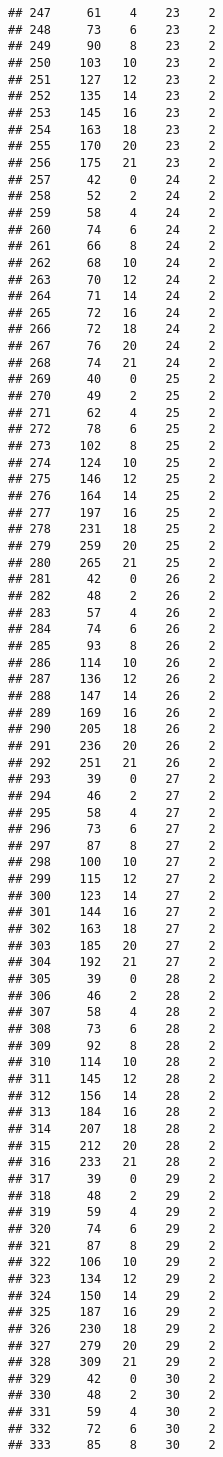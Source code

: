 \documentclass[
]{article}
\begin{document}
\begin{verbatim}
## 247     61    4    23    2
## 248     73    6    23    2
## 249     90    8    23    2
## 250    103   10    23    2
## 251    127   12    23    2
## 252    135   14    23    2
## 253    145   16    23    2
## 254    163   18    23    2
## 255    170   20    23    2
## 256    175   21    23    2
## 257     42    0    24    2
## 258     52    2    24    2
## 259     58    4    24    2
## 260     74    6    24    2
## 261     66    8    24    2
## 262     68   10    24    2
## 263     70   12    24    2
## 264     71   14    24    2
## 265     72   16    24    2
## 266     72   18    24    2
## 267     76   20    24    2
## 268     74   21    24    2
## 269     40    0    25    2
## 270     49    2    25    2
## 271     62    4    25    2
## 272     78    6    25    2
## 273    102    8    25    2
## 274    124   10    25    2
## 275    146   12    25    2
## 276    164   14    25    2
## 277    197   16    25    2
## 278    231   18    25    2
## 279    259   20    25    2
## 280    265   21    25    2
## 281     42    0    26    2
## 282     48    2    26    2
## 283     57    4    26    2
## 284     74    6    26    2
## 285     93    8    26    2
## 286    114   10    26    2
## 287    136   12    26    2
## 288    147   14    26    2
## 289    169   16    26    2
## 290    205   18    26    2
## 291    236   20    26    2
## 292    251   21    26    2
## 293     39    0    27    2
## 294     46    2    27    2
## 295     58    4    27    2
## 296     73    6    27    2
## 297     87    8    27    2
## 298    100   10    27    2
## 299    115   12    27    2
## 300    123   14    27    2
## 301    144   16    27    2
## 302    163   18    27    2
## 303    185   20    27    2
## 304    192   21    27    2
## 305     39    0    28    2
## 306     46    2    28    2
## 307     58    4    28    2
## 308     73    6    28    2
## 309     92    8    28    2
## 310    114   10    28    2
## 311    145   12    28    2
## 312    156   14    28    2
## 313    184   16    28    2
## 314    207   18    28    2
## 315    212   20    28    2
## 316    233   21    28    2
## 317     39    0    29    2
## 318     48    2    29    2
## 319     59    4    29    2
## 320     74    6    29    2
## 321     87    8    29    2
## 322    106   10    29    2
## 323    134   12    29    2
## 324    150   14    29    2
## 325    187   16    29    2
## 326    230   18    29    2
## 327    279   20    29    2
## 328    309   21    29    2
## 329     42    0    30    2
## 330     48    2    30    2
## 331     59    4    30    2
## 332     72    6    30    2
## 333     85    8    30    2

\end{verbatim}
\end{document}

